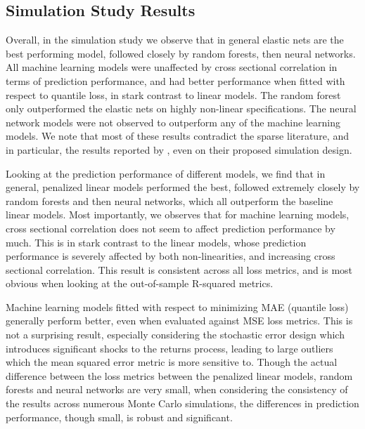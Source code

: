 \documentclass[11pt, a4paper, table]{article}
\begin{document}
\subsection{Simulation Study Results}

Overall, in the simulation study we observe that in general elastic nets are the best performing model, followed closely by random forests, then neural networks. All machine learning models were unaffected by cross sectional correlation in terms of prediction performance, and had better performance when fitted with respect to quantile loss, in stark contrast to linear models. The random forest only outperformed the elastic nets on highly non-linear specifications. The neural network models were not observed to outperform any of the machine learning models. We note that most of these results contradict the sparse literature, and in particular, the results reported by \cite{gu_empirical_2018}, even on their proposed simulation design.


Looking at the prediction performance of different models, we find that in general, penalized linear models performed the best, followed extremely closely by random forests and then neural networks, which all outperform the baseline linear models. Most importantly, we observes that for machine learning models, cross sectional correlation does not seem to affect prediction performance by much. This is in stark contrast to the linear models, whose prediction performance is severely affected by both non-linearities, and increasing cross sectional correlation. This result is consistent across all loss metrics, and is most obvious when looking at the out-of-sample R-squared metrics.

Machine learning models fitted with respect to minimizing MAE (quantile loss) generally perform better, even when evaluated against MSE loss metrics. This is not a surprising result, especially considering the stochastic error design which introduces significant shocks to the returns process, leading to large outliers which the mean squared error metric is more sensitive to. Though the actual difference between the loss metrics between the penalized linear models, random forests and neural networks are very small, when considering the consistency of the results across numerous Monte Carlo simulations, the differences in prediction performance, though small, is robust and significant.
\end{document}
